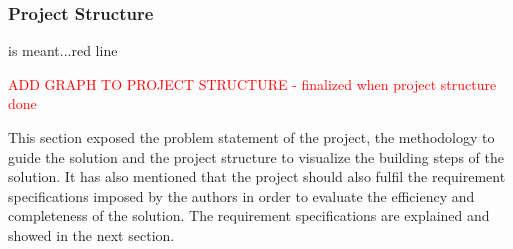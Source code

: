 

\subsubsection{Project Structure}

is meant...red line

\textcolor{red}{ADD GRAPH TO PROJECT STRUCTURE - finalized when project structure done}

This section exposed the problem statement of the project, the methodology to guide the solution and the project structure to visualize the building steps of the solution. It has also mentioned that the project should also fulfil the requirement specifications imposed by the authors in order to evaluate the efficiency and completeness of the solution. The requirement specifications are explained and showed in the next section.